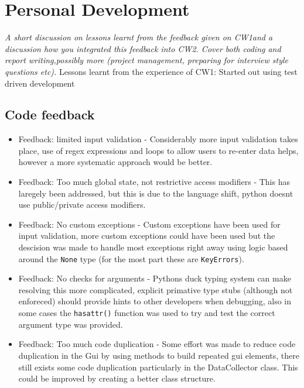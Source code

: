 \documentclass[11pt]{article}
\newcommand{\code}[1]{\colorbox{light-gray}{\texttt{#1}}}
\begin{document}
\section{Personal Development}
\emph{A short discussion on lessons learnt from the feedback given on CW1and a discussion how you integrated this feedback into CW2.  Cover both coding and report writing,possibly more (project management, preparing for interview style questions etc).}
Lessons learnt from the experience of CW1:
Started out using test driven development

\subsection{Code feedback}

\begin{itemize}
    \item Feedback: limited input validation - Considerably more input validation takes place, use of regex expressions and loops to allow users to re-enter data helps, however a more systematic approach would be better.
    \item Feedback: Too much global state, not restrictive access modifiers - This has laregely been addressed, but this is due to the language shift, python doesnt use public/private access modifiers.
    \item Feedback: No custom exceptions - Custom exceptions have been used for input validation, more custom exceptions could have been used but the descision was made to handle most exceptions right away using logic based around the \code{None} type (for the most part these are \code{KeyErrors}).
    \item Feedback: No checks for arguments - Pythons duck typing system can make resolving this more complicated, explicit primative type stubs (although not enforeced) should provide hints to other developers when debugging, also in some cases the \code{hasattr()} function was used to try and test the correct argument type was provided.
    \item Feedback: Too much code duplication - Some effort was made to reduce code duplication in the Gui by using methods to build repeated gui elements, there still exists some code duplication particularly in the DataCollector class. This could be improved by creating a better class structure. 
\end{itemize}
\end{document}
